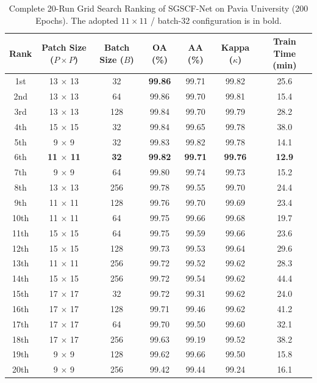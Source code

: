 \documentclass[manuscript,screen,review]{acmart}
\begin{document}
\begin{table}[t]
\centering
\footnotesize
\caption{Complete 20-Run Grid Search Ranking of SGSCF-Net on Pavia University (200 Epochs). The adopted $11 \times 11$ / batch-32 configuration is in bold.}
\label{tab:grid_search_pu}
\begin{tabular*}{\textwidth}{@{\extracolsep{\fill}}ccccccc}
\toprule
\textbf{Rank} & \textbf{Patch Size ($P \times P$)} & \textbf{Batch Size ($B$)} & \textbf{OA (\%)} & \textbf{AA (\%)} & \textbf{Kappa ($\kappa$)} & \textbf{Train Time (min)} \\
\midrule
1st  & 13 $\times$ 13          & 32           & \textbf{99.86} & 99.71 & 99.82 & 25.6 \\
2nd  & 13 $\times$ 13          & 64           & 99.86          & 99.70 & 99.81 & 15.4 \\
3rd  & 13 $\times$ 13          & 128          & 99.84          & 99.70 & 99.79 & 28.2 \\
4th  & 15 $\times$ 15          & 32           & 99.84          & 99.65 & 99.78 & 38.0 \\
5th  & 9 $\times$ 9            & 32           & 99.83          & 99.82 & 99.78 & 14.1 \\
6th  & \textbf{11 $\times$ 11} & \textbf{32}  & \textbf{99.82} & \textbf{99.71} & \textbf{99.76} & \textbf{12.9} \\
7th  & 9 $\times$ 9            & 64           & 99.80          & 99.74 & 99.73 & 15.2 \\
8th  & 13 $\times$ 13          & 256          & 99.78          & 99.55 & 99.70 & 24.4 \\
9th  & 11 $\times$ 11          & 128          & 99.76          & 99.70 & 99.69 & 23.4 \\
10th & 11 $\times$ 11          & 64           & 99.75          & 99.66 & 99.68 & 19.7 \\
11th & 15 $\times$ 15          & 64           & 99.75          & 99.59 & 99.66 & 23.6 \\
12th & 15 $\times$ 15          & 128          & 99.73          & 99.53 & 99.64 & 29.6 \\
13th & 11 $\times$ 11          & 256          & 99.72          & 99.52 & 99.62 & 28.3 \\
14th & 15 $\times$ 15          & 256          & 99.72          & 99.54 & 99.62 & 44.4 \\
15th & 17 $\times$ 17          & 32           & 99.72          & 99.31 & 99.62 & 24.0 \\
16th & 17 $\times$ 17          & 128          & 99.71          & 99.46 & 99.62 & 41.2 \\
17th & 17 $\times$ 17          & 64           & 99.70          & 99.50 & 99.60 & 32.1 \\
18th & 17 $\times$ 17          & 256          & 99.63          & 99.19 & 99.52 & 38.2 \\
19th & 9 $\times$ 9            & 128          & 99.62          & 99.66 & 99.50 & 15.8 \\
20th & 9 $\times$ 9            & 256          & 99.42          & 99.44 & 99.24 & 16.1 \\
\bottomrule
\end{tabular*}
\end{table}
\end{document}
